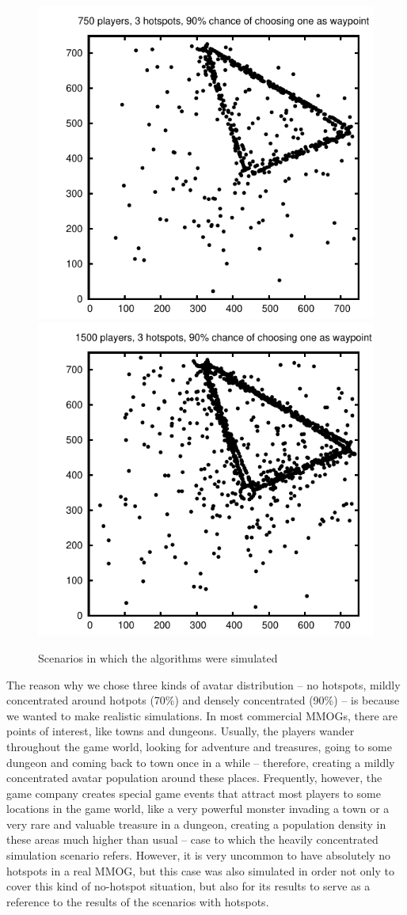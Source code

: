 \documentclass[acmjacm]{acmtrans2m}
\begin{document}
\begin{figure}
  \includegraphics[width=0.49\linewidth]{data/750players_prob90/avatarsdistribution}
  \includegraphics[width=0.49\linewidth]{data/1500players_prob90/avatarsdistribution}
  \caption{Scenarios in which the algorithms were simulated}
   \label{fig:scenarios}
\end{figure}

The reason why we chose three kinds of avatar distribution -- no hotspots, mildly concentrated around hotpots (70\%) and densely concentrated (90\%) -- is because we wanted to make realistic simulations. In most commercial MMOGs, there are points of interest, like towns and dungeons. Usually, the players wander throughout the game world, looking for adventure and treasures, going to some dungeon and coming back to town once in a while -- therefore, creating a mildly concentrated avatar population around these places. Frequently, however, the game company creates special game events that attract most players to some locations in the game world, like a very powerful monster invading a town or a very rare and valuable treasure in a dungeon, creating a population density in these areas much higher than usual -- case to which the heavily concentrated simulation scenario refers. However, it is very uncommon to have absolutely no hotspots in a real MMOG, but this case was also simulated in order not only to cover this kind of no-hotspot situation, but also for its results to serve as a reference to the results of the scenarios with hotspots.
\end{document}
